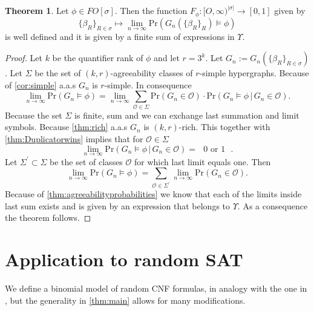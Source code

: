 \documentclass[12pt,notitlepage,a4paper]{article}
\theoremstyle{definition}
\newtheorem{theorem}{Theorem}[section]
\newcommand{\Ln}{\lim\limits_{n\to \infty}}
\begin{document}
\begin{theorem}
	Let $\phi\in FO[\sigma]$. Then the function 
	$F_\phi: [O,\infty)^{|\sigma|}\rightarrow [0,1]$
	given by
	\[
	\{\beta_R\}_{R\in \sigma} \mapsto
	\Ln \mathrm{Pr} \left(
	G_n\left(\{\beta_R\}_{R}\right) \models \phi
	\right)
	\]
	is well defined and it is given by a finite sum of expressions
	in $\Upsilon$.
\end{theorem}
\begin{proof}
	Let $k$ be the quantifier rank of $\phi$ and
	let $r=3^k$. Let 
	$G_n:=G_n\left(\{\beta_R\}_{R\in \sigma}\right)$.
	Let $\Sigma$ be the set of $(k,r)$-agreeability classes of 
	$r$-simple hypergraphs. Because of \cref{cor:simple} a.a.s 
	$G_n$ is $r$-simple. In consequence
	\begin{equation} \label{eq:aux1}
	\Ln \mathrm{Pr} \left(
	G_n \models \phi
	\right)=
	\Ln
	\sum_{\mathcal{O}\in \Sigma} \mathrm{Pr}\left(
	G_n\in \mathcal{O}
	\right) \cdot 
	\mathrm{Pr}\left(
	G_n\models \phi \,
	\Big| \,
	G_n\in \mathcal{O}
	\right).
	\end{equation}
	Because the set $\Sigma$ is finite, sum and we can exchange
	last summation and limit symbols. Because \cref{thm:rich} a.a.s 
	$G_n$ is $(k,r)$-rich. This together with \cref{thm:Duplicatorwins}
	implies that for $\mathcal{O}\in \Sigma$
	\[
	\Ln \mathrm{Pr}\left(
	G_n\models \phi \,
	\Big| \,
	G_n\in \mathcal{O}
	\right) = 
	\text{ $0$ or $1$ }.
	\]
	Let $\Sigma^\prime\subset \Sigma$ be the set of classes 
	$\mathcal{O}$ for which last limit equals one. Then
	\[
	\Ln \mathrm{Pr} \left(
	G_n \models \phi
	\right)=
	\sum_{\mathcal{O}\in \Sigma^\prime}
	\Ln \mathrm{Pr}\left(
	G_n \in \mathcal{O}
	\right).		
	\]
	Because of \cref{thm:agreeabilityprobabilities} we know that
	each of the limits inside last sum exists and is given by
	an expression that belongs to $\Upsilon$. As a consequence the
	theorem follows. 	
\end{proof}

\section{Application to random SAT}\label{sec:SAT}

We define a binomial model of random CNF formulas, 
in analogy with the one in \cite{chvatal1992mick},
but the generality
in \cref{thm:main} allows for many modifications. \par
\end{document}
